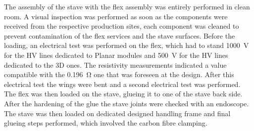 The assembly of the stave with the flex assembly was entirely performed in clean room. A visual inspection was performed as soon as the components were received from the respective production sites, each component was cleaned to prevent contamination of the flex services and the stave surfaces. Before the loading, an electrical test was performed on the flex, which had to stand \SI{1000}{\volt} for the HV lines dedicated to Planar modules and \SI{500}{\volt} for the HV lines dedicated to the 3D ones. The resistivity measurements indicated a value compatible with the \SI{0.196}{\ohm} one that was foreseen at the design.
After this electrical test the wings were bent and a second electrical test was performed. The flex was then loaded on the stave, glueing it to one of the stave back side. After the hardening of the glue the stave joints were checked with an endoscope. The stave was then loaded on dedicated designed handling frame and final glueing steps performed, which involved the carbon fibre clamping.

